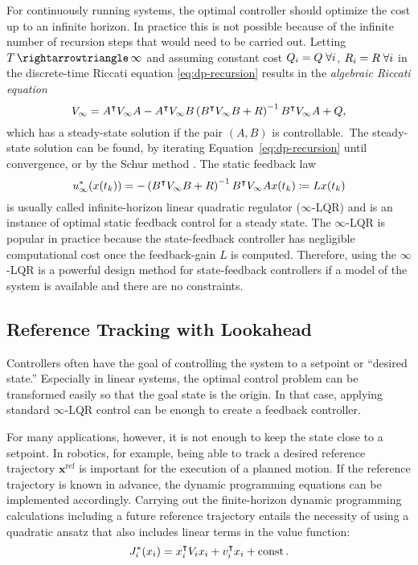 For continuously running systems, the optimal controller should
optimize the cost up to an infinite horizon. In practice this is not possible
because of the infinite number of recursion steps that would need to be
carried out. Letting $\HL \to \infty$ and assuming constant cost $Q_i = Q\;
\forall i$, $R_i = R\; \forall i$ in the discrete-time Riccati equation
\eqref{eq:dp-recursion} results in the \emph{algebraic Riccati equation}
\begin{equation}
  V_\infty = A^{\intercal} V_\infty A - A^{\intercal} V_\infty B \left(B^{\intercal} V_\infty
B + R \right)^{-1} B^{\intercal} V_\infty A + Q,
\end{equation}
which has a steady-state solution if the pair $(A,B)$ is
controllable.~\cite{Bertsekas:2005:Dynamic}\iss The steady-state solution can
be found, \eg by iterating Equation~\eqref{eq:dp-recursion} until convergence,
or by the Schur method \cite{Laub:1979:Schur}. The static feedback law
\begin{equation}
  u_\infty^*(x(t_k)) = -\left(B^{\intercal} V_\infty B + R\right)^{-1} B^{\intercal} V_\infty A
  x(t_k) \coloneqq Lx(t_k)
\end{equation}
is usually called infinite-horizon linear quadratic regulator ($\infty$-LQR)
and is an instance of optimal static feedback control for a steady state. The
$\infty$-LQR is popular in practice because the state-feedback controller has
negligible computational cost once the feedback-gain $L$ is computed. Therefore,
using the $\infty$-LQR is a powerful design method for state-feedback
controllers if a model of the system is available and there are no constraints.

\subsection{Reference Tracking with Lookahead}
\label{sec:dp-reference-tracking}

Controllers often have the goal of controlling the system to a setpoint or
``desired state.'' Especially in linear systems, the optimal control problem can
be transformed easily so that the goal state is the origin. In that case,
applying standard $\infty$-LQR control can be enough to create a feedback
controller.

For many applications, however, it is not enough to keep the state close to a
setpoint. In robotics, for example, being able to track a desired reference
trajectory $\mathbf{x}^\text{ref}$ is important for the execution of a planned
motion. If the reference trajectory is known in advance, the dynamic
programming equations can be implemented accordingly. Carrying out the
finite-horizon dynamic programming calculations including a future reference
trajectory entails the necessity of using a quadratic ansatz that also includes
linear terms in the value function:
\vspace{-\baselineskip}
\begin{equation}
  J_i^*(x_i) = x_i^{\intercal} V_i x_i + v_i^{\intercal} x_i + \operatorname{const}.
\end{equation}

